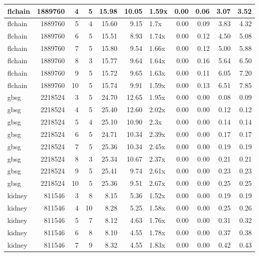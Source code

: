 \begin{table}[ht]
\begin{tabular}{lrrrrrlrrrr}
   \hline
flchain & 1889760 &   4 &   5 & 15.98 & 10.05 & 1.59x & 0.00 & 0.06 & 3.07 & 3.52 \\ 
   \hline
flchain & 1889760 &   5 &   4 & 15.60 & 9.15 & 1.7x & 0.00 & 0.09 & 3.83 & 4.32 \\ 
   \hline
flchain & 1889760 &   6 &   5 & 15.51 & 8.93 & 1.74x & 0.00 & 0.12 & 4.50 & 5.08 \\ 
   \hline
flchain & 1889760 &   7 &   5 & 15.80 & 9.54 & 1.66x & 0.00 & 0.12 & 5.00 & 5.88 \\ 
   \hline
flchain & 1889760 &   8 &   3 & 15.77 & 9.64 & 1.64x & 0.00 & 0.16 & 5.64 & 6.50 \\ 
   \hline
flchain & 1889760 &   9 &   5 & 15.72 & 9.65 & 1.63x & 0.00 & 0.11 & 6.05 & 7.20 \\ 
   \hline
flchain & 1889760 &  10 &   5 & 15.74 & 9.91 & 1.59x & 0.00 & 0.13 & 6.51 & 7.85 \\ 
   \hline
gbsg & 2218524 &   3 &   5 & 24.70 & 12.65 & 1.95x & 0.00 & 0.00 & 0.08 & 0.09 \\ 
   \hline
gbsg & 2218524 &   4 &   5 & 25.40 & 12.60 & 2.02x & 0.00 & 0.00 & 0.12 & 0.12 \\ 
   \hline
gbsg & 2218524 &   5 &   4 & 25.10 & 10.90 & 2.3x & 0.00 & 0.00 & 0.14 & 0.14 \\ 
   \hline
gbsg & 2218524 &   6 &   5 & 24.71 & 10.34 & 2.39x & 0.00 & 0.00 & 0.17 & 0.17 \\ 
   \hline
gbsg & 2218524 &   7 &   5 & 25.36 & 10.34 & 2.45x & 0.00 & 0.00 & 0.19 & 0.19 \\ 
   \hline
gbsg & 2218524 &   8 &   3 & 25.34 & 10.67 & 2.37x & 0.00 & 0.00 & 0.21 & 0.21 \\ 
   \hline
gbsg & 2218524 &   9 &   5 & 25.41 & 9.74 & 2.61x & 0.00 & 0.00 & 0.23 & 0.23 \\ 
   \hline
gbsg & 2218524 &  10 &   5 & 25.36 & 9.51 & 2.67x & 0.00 & 0.00 & 0.25 & 0.25 \\ 
   \hline
kidney & 811546 &   3 &   8 & 8.15 & 5.36 & 1.52x & 0.00 & 0.00 & 0.19 & 0.19 \\ 
   \hline
kidney & 811546 &   4 &  10 & 8.28 & 5.25 & 1.58x & 0.00 & 0.00 & 0.25 & 0.26 \\ 
   \hline
kidney & 811546 &   5 &   7 & 8.12 & 4.63 & 1.76x & 0.00 & 0.00 & 0.31 & 0.32 \\ 
   \hline
kidney & 811546 &   6 &   8 & 8.10 & 4.55 & 1.78x & 0.00 & 0.00 & 0.37 & 0.38 \\ 
   \hline
kidney & 811546 &   7 &   9 & 8.32 & 4.55 & 1.83x & 0.00 & 0.00 & 0.42 & 0.43 \\ 

\end{tabular}
\end{table}
